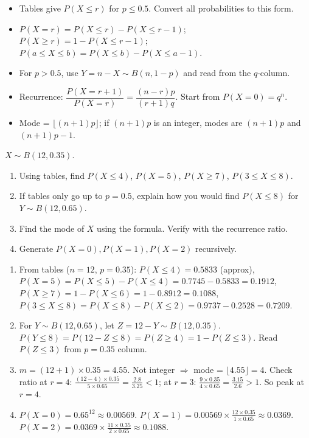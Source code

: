 \documentclass[11pt]{article}
\newcounter{popsec}
\newcounter{popsub}
\newcommand{\courssub}[1]{%
  \stepcounter{popsub}%
  \par\vspace{9pt}\noindent{\popxbold\fontsize{11.5}{13}\selectfont\color{popink}{\color{poporange}\thepopsec.\thepopsub}\hspace{6pt}#1}\par\nopagebreak\vspace{4pt}
}
\begin{document}
\courssub{Summary of Key Points}

\begin{aretenir}
\begin{itemize}
  \item Tables give $P(X\le r)$ for $p\le0.5$.  Convert all probabilities to this form.
  \item $P(X=r)=P(X\le r)-P(X\le r-1)$; $P(X\ge r)=1-P(X\le r-1)$; $P(a\le X\le b)=P(X\le b)-P(X\le a-1)$.
  \item For $p>0.5$, use $Y=n-X\sim B(n,1-p)$ and read from the $q$-column.
  \item Recurrence: $\dfrac{P(X=r+1)}{P(X=r)}=\dfrac{(n-r)p}{(r+1)q}$.  Start from $P(X=0)=q^n$.
  \item Mode = $\lfloor(n+1)p\rfloor$; if $(n+1)p$ is an integer, modes are $(n+1)p$ and $(n+1)p-1$.
\end{itemize}
\end{aretenir}

\begin{exercice}
$X\sim B(12,0.35)$.
\begin{enumerate}
  \item Using tables, find $P(X\le 4)$, $P(X=5)$, $P(X\ge 7)$, $P(3\le X\le 8)$.
  \item If tables only go up to $p=0.5$, explain how you would find $P(X\le 8)$ for $Y\sim B(12,0.65)$.
  \item Find the mode of $X$ using the formula.  Verify with the recurrence ratio.
  \item Generate $P(X=0), P(X=1), P(X=2)$ recursively.
\end{enumerate}
\end{exercice}

\begin{corrige}[Exercise 1]
\begin{enumerate}
  \item From tables ($n=12$, $p=0.35$):
    $P(X\le4)=0.5833$ (approx),
    $P(X=5)=P(X\le5)-P(X\le4)=0.7745-0.5833=0.1912$,
    $P(X\ge7)=1-P(X\le6)=1-0.8912=0.1088$,
    $P(3\le X\le8)=P(X\le8)-P(X\le2)=0.9737-0.2528=0.7209$.
  \item For $Y\sim B(12,0.65)$, let $Z=12-Y\sim B(12,0.35)$.
    $P(Y\le8)=P(12-Z\le8)=P(Z\ge4)=1-P(Z\le3)$.  Read $P(Z\le3)$ from $p=0.35$ column.
  \item $m=(12+1)\times0.35=4.55$.  Not integer $\Rightarrow$ mode = $\lfloor4.55\rfloor=4$.
    Check ratio at $r=4$: $\frac{(12-4)\times0.35}{5\times0.65}=\frac{2.8}{3.25}<1$; at $r=3$: $\frac{9\times0.35}{4\times0.65}=\frac{3.15}{2.6}>1$.  So peak at $r=4$.
  \item $P(X=0)=0.65^{12}\approx0.00569$.
    $P(X=1)=0.00569\times\frac{12\times0.35}{1\times0.65}\approx0.0369$.
    $P(X=2)=0.0369\times\frac{11\times0.35}{2\times0.65}\approx0.1088$.
\end{enumerate}
\end{corrige}
\end{document}
